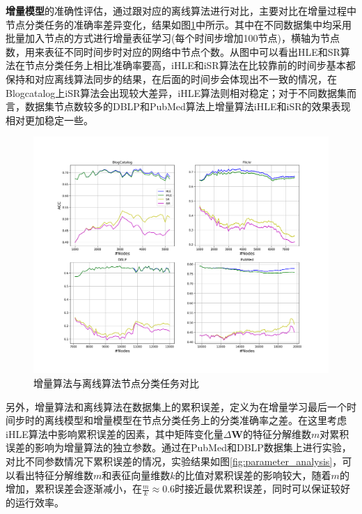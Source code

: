 \textbf{增量模型}的准确性评估，通过跟对应的离线算法进行对比，主要对比在增量过程中节点分类任务的准确率差异变化，结果如图\ref{fig:off_vs_on}中所示。其中在不同数据集中均采用批量加入节点的方式进行增量表征学习(每个时间步增加100节点)，横轴为节点数，用来表征不同时间步时对应的网络中节点个数。从图中可以看出HLE和SR算法在节点分类任务上相比准确率要高，iHLE和iSR算法在比较靠前的时间步基本都保持和对应离线算法同步的结果，在后面的时间步会体现出不一致的情况，在Blogcatalog上iSR算法会出现较大差异，iHLE算法则相对稳定；对于不同数据集而言，数据集节点数较多的DBLP和PubMed算法上增量算法iHLE和iSR的效果表现相对更加稳定一些。
\begin{figure}
	\centering
	\includegraphics[width=6.5in]{figures/off_vs_on}
	\caption{增量算法与离线算法节点分类任务对比}
	\label{fig:off_vs_on}
\end{figure}

另外，增量算法和离线算法在数据集上的累积误差，定义为在增量学习最后一个时间步时的离线模型和增量模型在节点分类任务上的分类准确率之差。在这里考虑iHLE算法中影响累积误差的因素，其中矩阵变化量$\Delta\textbf{W}$的特征分解维数$m$对累积误差的影响为增量算法的独立参数。通过在PubMed和DBLP数据集上进行实验，对比不同参数情况下累积误差的情况，实验结果如图\ref{fig:parameter_analysis}，可以看出特征分解维数$m$和表征向量维数$k$的比值对累积误差的影响较大，随着$m$的增加，累积误差会逐渐减小，在$\frac{m}{k}\approx0.6$时接近最优累积误差，同时可以保证较好的运行效率。

